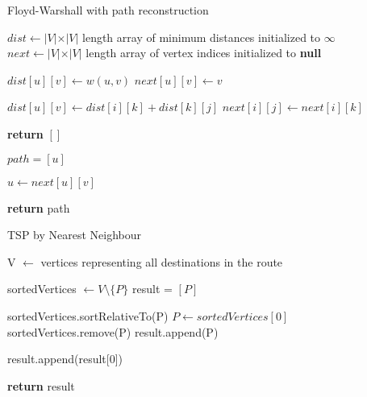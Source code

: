 \documentclass{article}
\begin{document}
\begin{algorithm}[h]
\caption{Floyd-Warshall with path reconstruction}
\begin{algorithmic}[1]

\State $dist \gets  \vert V \vert \times \vert V \vert$ length array of minimum distances initialized to $\infty$
\State $next \gets \vert V \vert \times \vert V \vert$ length array of vertex indices initialized to \textbf{null}


	\State $dist[u][v] \gets w(u, v)$
	\State $next[u][v] \gets v$
\EndFor

				\State $dist[u][v] \gets dist[i][k] + dist[k][j]$
				\State $next[i][j] \gets next[i][k]$
			\EndIf
		\EndFor
	\EndFor
\EndFor

\EndProcedure


	\State \textbf{return} $[]$
\EndIf

\State $path = [u]$

	\State $u \gets next[u][v]$
	\State {}
\EndWhile

\State \textbf{return} path

\EndProcedure

\end{algorithmic}
\end{algorithm}


\begin{algorithm}[h]
\caption{TSP by Nearest Neighbour}
\begin{algorithmic}[1]

\State V $\gets$ vertices representing all destinations in the route


\State sortedVertices $\gets V \setminus \{P\}$
\State result = $[P]$

	\State sortedVertices.sortRelativeTo(P)
	\State $P \gets sortedVertices[0]$
	\State sortedVertices.remove(P)
	\State result.append(P)
\EndWhile

\State result.append(result[0])

\State \textbf{return} result
\EndProcedure

\end{algorithmic}
\end{algorithm}
\end{document}
